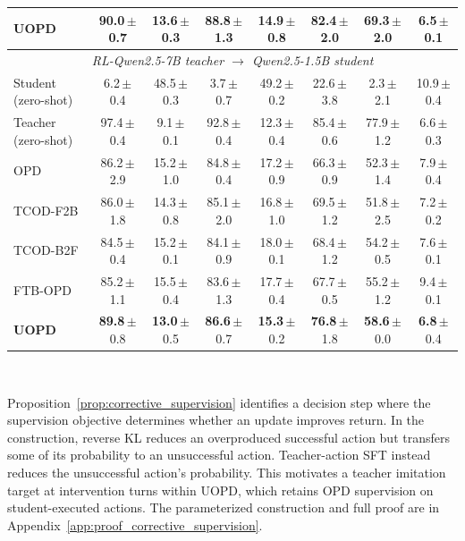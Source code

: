 \begin{table}[!t]
\begin{tabular*}{\textwidth}{@{\extracolsep{\fill}}l cccc ccc@{}}
\textbf{UOPD} & \textbf{90.0}\,\scriptsize{$\pm$0.7} & \textbf{13.6}\,\scriptsize{$\pm$0.3} & \textbf{88.8}\,\scriptsize{$\pm$1.3} & 14.9\,\scriptsize{$\pm$0.8} & \textbf{82.4}\,\scriptsize{$\pm$2.0} & \textbf{69.3}\,\scriptsize{$\pm$2.0} & \textbf{6.5}\,\scriptsize{$\pm$0.1} \\
\midrule
\multicolumn{8}{c}{\textit{RL-Qwen2.5-7B teacher $\rightarrow$ Qwen2.5-1.5B student}} \\
\addlinespace[2pt]
Student (zero-shot) & 6.2\,\scriptsize{$\pm$0.4} & 48.5\,\scriptsize{$\pm$0.3} & 3.7\,\scriptsize{$\pm$0.7} & 49.2\,\scriptsize{$\pm$0.2} & 22.6\,\scriptsize{$\pm$3.8} & 2.3\,\scriptsize{$\pm$2.1} & 10.9\,\scriptsize{$\pm$0.4} \\
Teacher (zero-shot) & 97.4\,\scriptsize{$\pm$0.4} & 9.1\,\scriptsize{$\pm$0.1} & 92.8\,\scriptsize{$\pm$0.4} & 12.3\,\scriptsize{$\pm$0.4} & 85.4\,\scriptsize{$\pm$0.6} & 77.9\,\scriptsize{$\pm$1.2} & 6.6\,\scriptsize{$\pm$0.3} \\
\midrule
OPD & 86.2\,\scriptsize{$\pm$2.9} & 15.2\,\scriptsize{$\pm$1.0} & 84.8\,\scriptsize{$\pm$0.4} & 17.2\,\scriptsize{$\pm$0.9} & 66.3\,\scriptsize{$\pm$0.9} & 52.3\,\scriptsize{$\pm$1.4} & 7.9\,\scriptsize{$\pm$0.4} \\
TCOD-F2B & 86.0\,\scriptsize{$\pm$1.8} & 14.3\,\scriptsize{$\pm$0.8} & 85.1\,\scriptsize{$\pm$2.0} & 16.8\,\scriptsize{$\pm$1.0} & 69.5\,\scriptsize{$\pm$1.2} & 51.8\,\scriptsize{$\pm$2.5} & 7.2\,\scriptsize{$\pm$0.2} \\
TCOD-B2F & 84.5\,\scriptsize{$\pm$0.4} & 15.2\,\scriptsize{$\pm$0.1} & 84.1\,\scriptsize{$\pm$0.9} & 18.0\,\scriptsize{$\pm$0.1} & 68.4\,\scriptsize{$\pm$1.2} & 54.2\,\scriptsize{$\pm$0.5} & 7.6\,\scriptsize{$\pm$0.1} \\
FTB-OPD & 85.2\,\scriptsize{$\pm$1.1} & 15.5\,\scriptsize{$\pm$0.4} & 83.6\,\scriptsize{$\pm$1.3} & 17.7\,\scriptsize{$\pm$0.4} & 67.7\,\scriptsize{$\pm$0.5} & 55.2\,\scriptsize{$\pm$1.2} & 9.4\,\scriptsize{$\pm$0.1} \\
\textbf{UOPD} & \textbf{89.8}\,\scriptsize{$\pm$0.8} & \textbf{13.0}\,\scriptsize{$\pm$0.5} & \textbf{86.6}\,\scriptsize{$\pm$0.7} & \textbf{15.3}\,\scriptsize{$\pm$0.2} & \textbf{76.8}\,\scriptsize{$\pm$1.8} & \textbf{58.6}\,\scriptsize{$\pm$0.0} & \textbf{6.8}\,\scriptsize{$\pm$0.4} \\
\bottomrule
\end{tabular*}
\\[3pt]
\vspace{-5mm}
\end{table}

Proposition~\ref{prop:corrective_supervision} identifies a decision step where the supervision objective determines whether an update improves return. In the construction, reverse KL reduces an overproduced successful action but transfers some of its probability to an unsuccessful action. Teacher-action SFT instead reduces the unsuccessful action's probability. This motivates a teacher imitation target at intervention turns within UOPD, which retains OPD supervision on student-executed actions. The parameterized construction and full proof are in Appendix~\ref{app:proof_corrective_supervision}.
